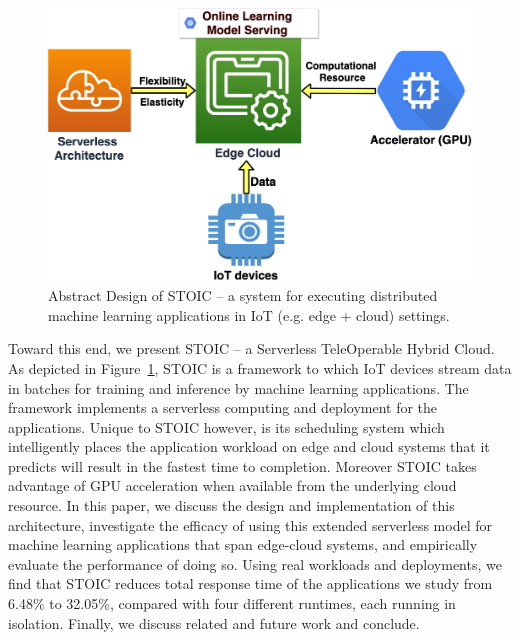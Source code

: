 \begin{figure}
    \centering
    \includegraphics[scale=0.25]{figures/edge}
    \caption{Abstract Design of STOIC -- a system for executing
distributed machine learning applications in IoT (e.g. edge + cloud) settings.
\label{fig:edge}}
\end{figure}

Toward this end, we present STOIC -- a Serverless TeleOperable Hybrid Cloud.
As depicted in Figure~\ref{fig:edge}, STOIC is a framework 
to which
IoT devices stream data in batches for training and inference by
machine learning applications.  The framework implements
a serverless computing and deployment for the applications. Unique to STOIC
however, is its scheduling system which intelligently places the application
workload on edge and cloud systems that it predicts will result in the fastest
time to completion.  Moreover STOIC takes advantage
of GPU acceleration when available from the underlying cloud resource.  
In this paper, we discuss the design and implementation of this architecture, investigate the efficacy of using this extended serverless model
for machine learning applications that span edge-cloud systems, 
and  empirically evaluate the performance of doing so. Using
real workloads and deployments,  we  find that STOIC reduces total 
response time of the applications we study from 6.48\% to 32.05\%, 
compared with four different runtimes, each running in isolation. 
Finally, we discuss related and future work and conclude.
